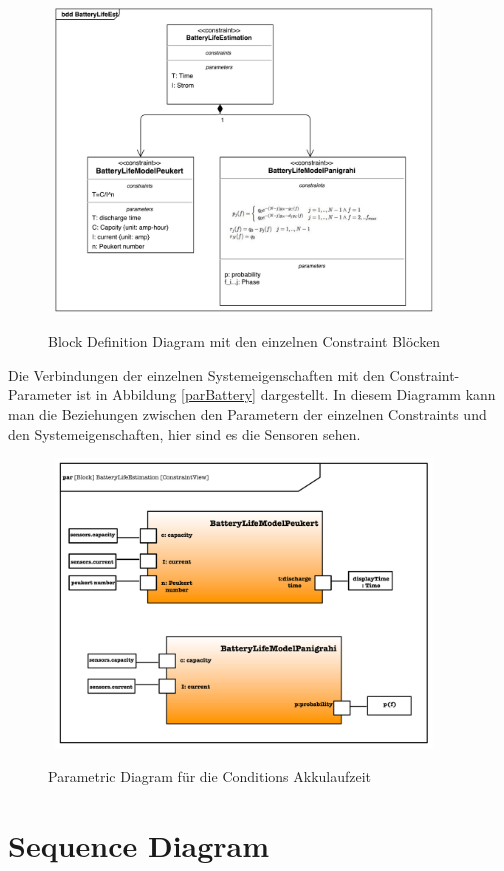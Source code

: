 \begin{figure}[H]
\centering\
\includegraphics[width=10cm]{img/batterybdd}
\caption{Block Definition Diagram mit den einzelnen Constraint Blöcken}\label{fig:blockBattery}
\end{figure}

Die Verbindungen der einzelnen Systemeigenschaften mit den Constraint-Parameter ist in 
Abbildung \ref{parBattery} dargestellt.
In diesem Diagramm kann man die Beziehungen zwischen den Parametern der einzelnen Constraints und den Systemeigenschaften, hier sind es die Sensoren sehen.

\begin{figure}[H]
\centering\
\includegraphics[width=10cm]{img/batteryParametric}
\caption{Parametric Diagram für die Conditions Akkulaufzeit}\label{fig:parBattery}
\end{figure}




\section{Sequence Diagram}

